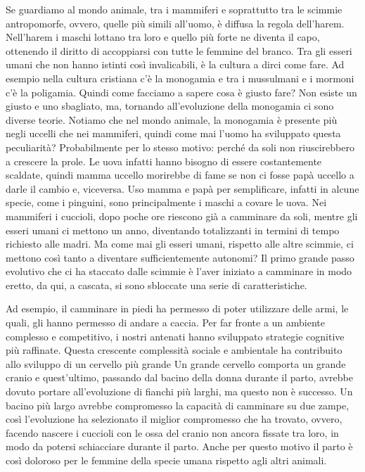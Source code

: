 \documentclass[12pt]{book} %
\begin{document}
Se guardiamo al mondo animale, tra i mammiferi e soprattutto tra le scimmie antropomorfe, ovvero, quelle più simili
all'uomo, è diffusa la regola dell'harem. Nell'harem i
maschi lottano tra loro e quello più forte ne diventa il capo, ottenendo il diritto di accoppiarsi con tutte le femmine
del branco. Tra gli esseri umani che non hanno istinti così invalicabili, è la cultura a dirci come fare. Ad
esempio nella cultura cristiana c'è la monogamia e tra i mussulmani e i mormoni c'è la poligamia. Quindi come facciamo a sapere
cosa è giusto fare? Non esiste un giusto e uno sbagliato, ma, tornando all'evoluzione
della monogamia ci sono diverse teorie. Notiamo che nel mondo animale, la monogamia è presente più negli uccelli che
nei mammiferi, quindi come mai l'uomo ha sviluppato questa peculiarità? Probabilmente per lo
stesso motivo: perché da soli non riuscirebbero a crescere la prole. Le uova infatti hanno bisogno di essere costantemente scaldate, quindi
mamma uccello morirebbe di fame se non ci fosse papà uccello a darle il cambio e, viceversa. Uso mamma e papà per semplificare,
infatti in alcune specie, come i pinguini, sono principalmente i maschi a covare le uova. Nei mammiferi i cuccioli,
dopo poche ore riescono già a camminare da soli, mentre gli esseri umani ci mettono un anno, diventando totalizzanti in
termini di tempo richiesto alle madri. Ma come mai gli esseri umani, rispetto alle altre scimmie, ci mettono così tanto
a diventare sufficientemente autonomi? Il primo grande passo evolutivo che ci ha staccato dalle scimmie è
l'aver iniziato a camminare in modo eretto, da qui, a cascata, si sono sbloccate una serie di
caratteristiche. 

Ad esempio, il camminare in piedi ha permesso di poter utilizzare delle armi, le quali, gli hanno permesso di andare a
caccia. Per far fronte a un ambiente complesso e competitivo, i nostri antenati hanno sviluppato strategie cognitive più raffinate. Questa crescente complessità sociale e ambientale ha contribuito allo sviluppo di un cervello più grande
Un grande cervello comporta un grande cranio e quest'ultimo,
passando dal bacino della donna durante il parto, avrebbe dovuto portare all'evoluzione di fianchi
più larghi, ma questo non è successo. Un bacino più largo avrebbe compromesso la capacità di camminare su due zampe,
così l'evoluzione ha selezionato il miglior compromesso che ha trovato, ovvero, facendo nascere
i cuccioli con le ossa del cranio non ancora fissate tra loro, in modo da potersi schiacciare durante il parto. Anche
per questo motivo il parto è così doloroso per le femmine della specie umana rispetto agli altri animali. 
\end{document}
